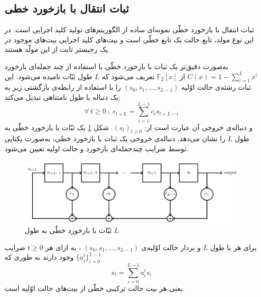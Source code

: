 \subsection{ثبات انتقال با بازخورد خطی}
ثبات انتقال با بازخورد خطّی  
نمونه‌ای ساده از الگوریتم‌های تولید کلید اجرایی است. در این نوع مولد، تابع حالت یک تابع خطّی است و بیت‌های کلید اجرایی بیت‌های موجود در یک رجیستر ثابت از این مولّد هستند. 

به‌صورت دقیق‌تر یک ثبات با بازخورد خطّی با استفاده از چند جمله‌ای بازخورد 
{\small $C(x) = 1- \sum_{i = 1}^{L}x^{i}$}
از 
$\mathbb{F}_{2}[x]$
تعریف می‌شود که 
$L$
طول ثبّات نامیده می‌شود.  این ثبات رشته‌ی حالت اوّلیه 
$(s_{0},s_{1},...,s_{L-1})$
را با استفاده از رابطه‌ی بازگشتی زیر به یک دنباله با طول نامتناهی تبدیل می‌کند:
$$\forall \  t \geq 0 \ : \ s_{t+L} = \sum_{i = 1}^{L-1}c_{i}s_{t+L-i}$$
و دنباله‌ی خروجی آن	عبارت است از:
$(s_{t})_{t\geq 0}$.
شکل 
\ref{fig:lfsr}
یک ثبّات با بازخورد خطّی به طول 
$L$
را نشان می‌دهد. دنباله‌ی خروجی یک ثبات با بازخورد خطی، به‌صورت یکتایی توسط ضرایب چندجمله‌ای بازخورد و حالت اولیه‌ تعیین می‌شود. 
\begin{figure}[h]
	\centering
	\includegraphics[width=0.65\linewidth]{Images/LFSR}
	\caption{ثبّات با بازخورد خطّی به طول $L$}
	\label{fig:lfsr}
\end{figure}
\begin{lemma}
	برای هر
	با طول 
	$L$
	و بردار حالت اوّلیه‌ی
	$(s_{0},s_{1},...,s_{L-1})$
	، به ازای هر 
	$t\geq 0$
	ضرایب 
	$\{a_{i}^{t}\}_{i = 0}^{L-1}$
	وجود دارند به طوری که
	$$s_{t} = \sum_{i = 0}^{L-1}a_{i}^{t}s_{i}$$
	یعنی هر بیت حالت ترکیبی خطّی از بیت‌های حالت اوّلیه است.
	
\end{lemma}

